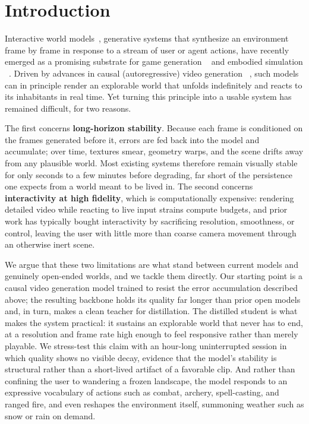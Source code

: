 \section{Introduction}
Interactive world models~\cite{genie3,Gamegen-x,Yume,matrix2,matrix3,Worldplay,team2026dreamx}, generative systems that synthesize an environment frame by frame in response to a stream of user or agent actions, have recently emerged as a promising substrate for game generation ~\cite{Gamegen-x,solaris,matrix2,matrix3,worlddirector} and
embodied simulation ~\cite{cosmos,Abot-physworld,giga}. Driven by advances in causal (autoregressive) video generation ~\cite{CasualVid,MAGI-1,SkyReels,yang2025longlive,longlive_2.0,minWM},
such models can in principle render an explorable world that unfolds indefinitely and reacts to its inhabitants in real time. Yet turning this principle into a usable system has remained difficult, for two reasons.

The first concerns \textbf{long-horizon stability}. Because each frame is conditioned on the frames generated before it, errors are fed back into the model and accumulate; over time, textures smear, geometry warps, and the scene drifts away from any plausible world. Most existing systems therefore remain visually stable for only seconds to a few minutes before degrading, far short of the persistence one expects from a world meant to be lived in. The second concerns \textbf{interactivity at high fidelity}, which is computationally expensive: rendering detailed video while reacting to live input strains compute
budgets, and prior work has typically bought interactivity by sacrificing resolution, smoothness, or control, leaving the user with little more than coarse camera movement through an otherwise inert scene.

We argue that these two limitations are what stand between current models and genuinely open-ended worlds, and we tackle them directly. Our starting point is a causal video generation model trained to resist the error accumulation described above; the resulting backbone holds its quality far longer than prior open models and, in turn, makes a clean teacher for distillation. The distilled student is what makes the system practical: it sustains an explorable world that never has to end, at a resolution and frame rate high enough to feel responsive rather than merely playable. We stress-test this claim with an hour-long uninterrupted session in which quality shows no visible decay, evidence that the model's stability is structural rather than a short-lived artifact of a favorable clip. And rather than confining the user to wandering a frozen landscape, the model responds to an expressive vocabulary of actions such as combat, archery, spell-casting, and ranged fire, and even reshapes the environment itself, summoning weather such as snow or rain on demand.

